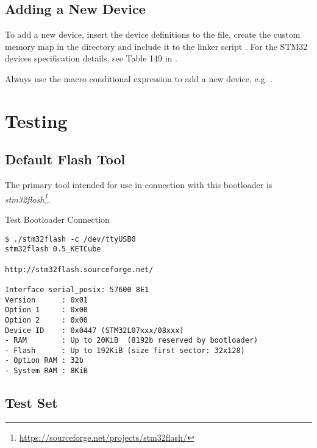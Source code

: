 
\subsection{Adding a New Device}

To add a new device, insert the device definitions to the  file, create the custom memory map in the  directory and include it to the linker script  . For the STM32 devices specification details, see Table 149 in \cite{STM32:AN2606}.

Always use the macro conditional expression to add a new device, e.g. .



\clearpage
\section{Testing}

\subsection{Default Flash Tool}

The primary tool intended for use in connection with this bootloader is {\it stm32flash\footnote{\url{https://sourceforge.net/projects/stm32flash/}}}.

\begin{docCodeExampleTitled}{Test Bootloader Connection}
\begin{verbatim}
$ ./stm32flash -c /dev/ttyUSB0 
stm32flash 0.5_KETCube

http://stm32flash.sourceforge.net/

Interface serial_posix: 57600 8E1
Version      : 0x01
Option 1     : 0x00
Option 2     : 0x00
Device ID    : 0x0447 (STM32L07xxx/08xxx)
- RAM        : Up to 20KiB  (8192b reserved by bootloader)
- Flash      : Up to 192KiB (size first sector: 32x128)
- Option RAM : 32b
- System RAM : 8KiB
\end{verbatim}
\end{docCodeExampleTitled}

\subsection{Test Set}

